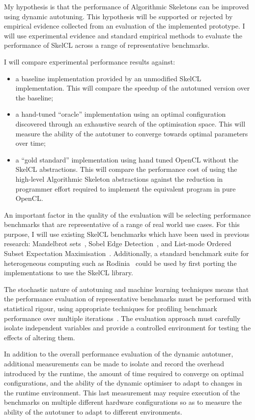 My hypothesis is that the performance of Algorithmic Skeletons can be
improved using dynamic autotuning. This hypothesis will be supported
or rejected by empirical evidence collected from an evaluation of the
implemented prototype. I will use experimental evidence and standard
empirical methods to evaluate the performance of SkelCL across a range
of representative benchmarks.

I will compare experimental performance results against:

\begin{itemize}
\item a baseline implementation provided by an unmodified SkelCL
implementation. This will compare the speedup of the autotuned version
over the baseline;
\item a hand-tuned ``oracle'' implementation using an optimal
configuration discovered through an exhaustive search of the
optimisation space. This will measure the ability of the autotuner
to converge towards optimal parameters over time;
\item a ``gold standard'' implementation using hand tuned OpenCL
without the SkelCL abstractions. This will compare the performance
cost of using the high-level Algorithmic Skeleton abstractions against
the reduction in programmer effort required to implement the
equivalent program in pure OpenCL.
\end{itemize}

An important factor in the quality of the evaluation will be selecting
performance benchmarks that are representative of a range of real
world use cases. For this purpose, I will use existing SkelCL
benchmarks which have been used in previous research: Mandelbrot
sets~\cite{Steuwer2011}, Sobel Edge Detection~\cite{Steuwer2013a}, and
List-mode Ordered Subset Expectation
Maximisation~\cite{Steuwer2013}. Additionally, a standard benchmark
suite for heterogeneous computing such as Rodinia~\cite{Che2009} could
be used by first porting the implementations to use the SkelCL
library.

The stochastic nature of autotuning and machine learning techniques
means that the performance evaluation of representative benchmarks
must be performed with statistical rigour, using appropriate
techniques for profiling benchmark performance over multiple
iterations~\cite{Georges2007}. The evaluation approach must carefully
isolate independent variables and provide a controlled environment for
testing the effects of altering them.

In addition to the overall performance evaluation of the dynamic
autotuner, additional measurements can be made to isolate and record
the overhead introduced by the runtime, the amount of time required to
converge on optimal configurations, and the ability of the dynamic
optimiser to adapt to changes in the runtime environment. This last
measurement may require execution of the benchmarks on multiple
different hardware configurations so as to measure the ability of the
autotuner to adapt to different environments.
